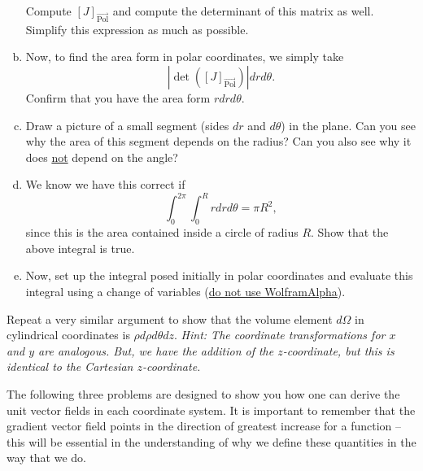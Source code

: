\documentclass[12pt]{article} %
\begin{document}
\begin{problem}
\begin{enumerate}[(a)]
        Compute $[J]_{\vec{\textrm{Pol}}}$ and compute the determinant of this matrix as well. Simplify this expression as much as possible.
        \item Now, to find the area form in polar coordinates, we simply take
        \[
        \left|\det\left([J]_{\vec{\textrm{Pol}}}\right)\right|drd\theta.
        \]
        Confirm that you have the area form $rdrd\theta$.
        \item Draw a picture of a small segment (sides $dr$ and $d\theta$) in the plane.  Can you see why the area of this segment depends on the radius? Can you also see why it does \underline{not} depend on the angle?
        \item We know we have this correct if 
        \[
        \int_{0}^{2\pi} \int_0^R rdrd\theta = \pi R^2,
        \]
        since this is the area contained inside a circle of radius $R$.  Show that the above integral is true.
        \item Now, set up the integral posed initially in polar coordinates and evaluate this integral using a change of variables (\underline{do not use WolframAlpha}).
    \end{enumerate}
\end{problem}

\vspace*{1cm}
\begin{problem}
    Repeat a very similar argument to show that the volume element $d\Omega$ in cylindrical coordinates is $\rho d\rho d\theta dz$.  \emph{Hint: The coordinate transformations for $x$ and $y$ are analogous.  But, we have the addition of the $z$-coordinate, but this is identical to the Cartesian $z$-coordinate.}
\end{problem}

\vspace*{1cm}
\begin{center}
The following three problems are designed to show you how one can derive the unit vector fields in each coordinate system. It is important to remember that the gradient vector field points in the direction of greatest increase for a function -- this will be essential in the understanding of why we define these quantities in the way that we do.
\end{center}
\end{document}
